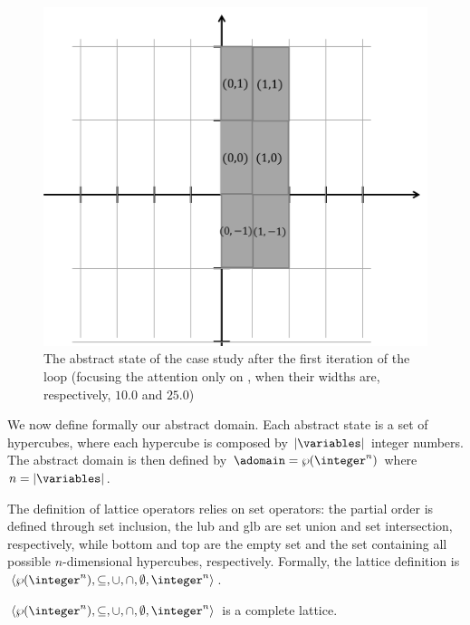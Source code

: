 \begin{figure}[ht]
\begin{centering}
\includegraphics[scale=0.35]{Pics/example_hc_2d_2.png}
\caption{The abstract state of the case study after the first iteration of the loop (focusing the attention only on , when their widths are, respectively, $10.0$ and $25.0$)}
\label{fig:hcExample2}
\end{centering}
\end{figure}


We now define formally our abstract domain. Each abstract state is a set of hypercubes, where each hypercube is composed by $|\variables|$ integer numbers. The abstract domain is then defined by $\adomain = \wp(\integer^n)$ where $n = |\variables|$.

The definition of lattice operators relies on set operators: the partial order is defined through set inclusion, the lub and glb are set union and set intersection, respectively, while bottom and top are the empty set and the set containing all possible $n$-dimensional hypercubes, respectively. Formally, the lattice definition is $\langle\wp(\integer^n), \subseteq, \cup, \cap, \emptyset, \integer^n\rangle$.

\begin{lemma}
$\langle\wp(\integer^n), \subseteq, \cup, \cap, \emptyset, \integer^n\rangle$ is a complete lattice.
\end{lemma}

